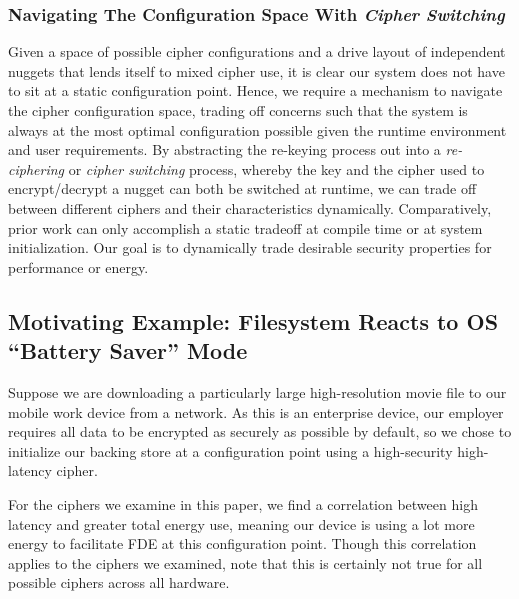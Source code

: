 \subsubsection{Navigating The Configuration Space With \emph{Cipher Switching}}

Given a space of possible cipher configurations and a drive layout of
independent nuggets that lends itself to mixed cipher use, it is clear our
system does not have to sit at a static configuration point. Hence, we require a
mechanism to navigate the cipher configuration space, trading off concerns such
that the system is always at the most optimal configuration possible given the
runtime environment and user requirements. By abstracting the re-keying process
out into a \emph{re-ciphering} or \emph{cipher switching} process, whereby the
key and the cipher used to encrypt/decrypt a nugget can both be switched at
runtime, we can trade off between different ciphers and their characteristics
dynamically. Comparatively, prior work can only accomplish a static tradeoff at
compile time or at system initialization. Our goal is to dynamically trade
desirable security properties for performance or energy.

\subsection{Motivating Example: Filesystem Reacts to OS ``Battery Saver'' Mode}


Suppose we are downloading a particularly large high-resolution movie file to
our mobile work device from a network. As this is an enterprise device, our
employer requires all data to be encrypted as securely as possible by default,
so we chose to initialize our backing store at a configuration point using a
high-security high-latency cipher.

For the ciphers we examine in this paper, we find a correlation between high
latency and greater total energy use, meaning our device is using a lot more
energy to facilitate FDE at this configuration point. Though this correlation
applies to the ciphers we examined, note that this is certainly not true for all
possible ciphers across all hardware.

